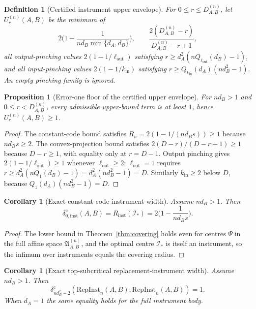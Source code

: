 \documentclass[11pt,a4paper]{article}
\newtheorem{proposition}[theorem]{Proposition}
\newtheorem{corollary}[theorem]{Corollary}
\newtheorem{definition}[theorem]{Definition}
\newcommand{\RepInst}{\mathrm{RepInst}}
\begin{document}
\begin{definition}[Certified instrument upper envelope]
\label{def:upper}
For $0\le r\le D_{A,B}^{(n)}$, let $U_r^{(n)}(A,B)$ be the minimum of
\[
2\Big(1-\frac1{nd_B\min\{d_A,d_B\}}\Big),\qquad
\frac{2(D_{A,B}^{(n)}-r)}{D_{A,B}^{(n)}-r+1},
\]
all output-pinching values $2(1-1/\ell_{\mathrm{out}})$ satisfying $r\ge d_A^2(nQ_{\ell_{\mathrm{out}}}(d_B)-1)$, and all input-pinching values $2(1-1/k_{\mathrm{in}})$ satisfying $r\ge Q_{k_{\mathrm{in}}}(d_A)(nd_B^2-1)$. An empty pinching family is ignored.
\end{definition}

\begin{proposition}[Error-one floor of the certified upper envelope]
\label{prop:floor}
For $nd_B>1$ and $0\le r<D_{A,B}^{(n)}$, every admissible upper-bound term is at least $1$, hence $U_r^{(n)}(A,B)\ge1$.
\end{proposition}

\begin{proof}
The constant-code bound satisfies $R_n=2(1-1/(nd_Bs))\ge1$ because $nd_Bs\ge2$. The convex-projection bound satisfies $2(D-r)/(D-r+1)\ge1$ because $D-r\ge1$, with equality only at $r=D-1$. Output pinching gives $2(1-1/\ell_{\mathrm{out}})\ge1$ whenever $\ell_{\mathrm{out}}\ge2$; $\ell_{\mathrm{out}}=1$ requires $r\ge d_A^2(nQ_1(d_B)-1)=d_A^2(nd_B^2-1)=D$. Similarly $k_{\mathrm{in}}\ge2$ below $D$, because $Q_1(d_A)(nd_B^2-1)=D$.
\end{proof}

\begin{corollary}[Exact constant-code instrument width]
\label{cor:constant-code}
Assume $nd_B>1$. Then
\[
\delta_{0,\mathrm{inst}}^{\diamond}(A,B)=R_{\mathrm{inst}}(\mathcal I_*)=2\Big(1-\frac1{nd_Bs}\Big).
\]
\end{corollary}

\begin{proof}
The lower bound in Theorem~\ref{thm:covering} holds even for centres $\Psi$ in the full affine space $\mathfrak A_{A,B}^{(n)}$, and the optimal centre $\mathcal I_*$ is itself an instrument, so the infimum over instruments equals the covering radius.
\end{proof}

\begin{corollary}[Exact top-subcritical replacement-instrument width]
\label{cor:top-subcritical}
Assume $nd_B>1$. Then
\[
\delta_{nd_B^2-2}^{\mathrm c}(\RepInst_n(A,B);\RepInst_n(A,B))=1.
\]
When $d_A=1$ the same equality holds for the full instrument body.
\end{corollary}
\end{document}

